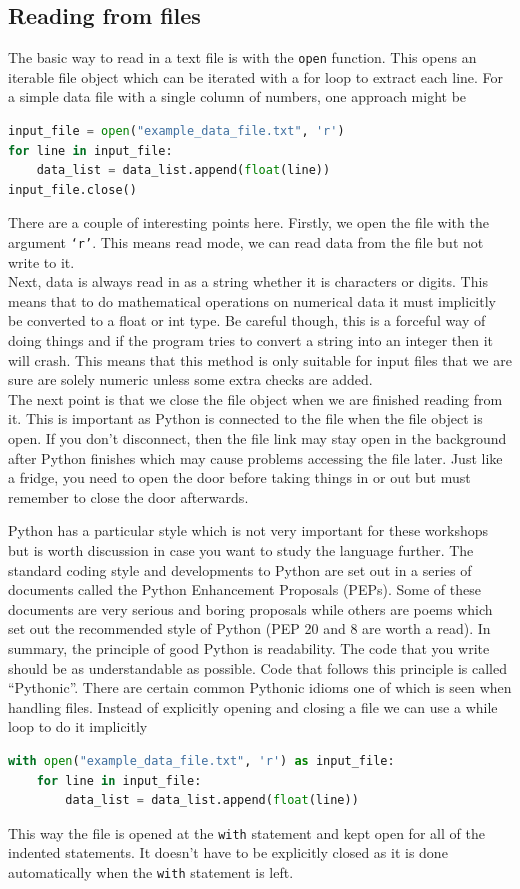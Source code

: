 	\subsection{Reading from files}
		The basic way to read in a text file is with the \texttt{open} function. This opens an iterable file object which can be iterated with a for loop to extract each line. For a simple data file with a single column of numbers, one approach might be
		\begin{lstlisting}[language=Python]
input_file = open("example_data_file.txt", 'r')
for line in input_file:
	data_list = data_list.append(float(line))
input_file.close()
\end{lstlisting}	
		There are a couple of interesting points here. Firstly, we open the file with the argument \texttt{`r'}. This means read mode, we can read data from the file but not write to it.\\
		Next, data is always read in as a string whether it is characters or digits. This means that to do mathematical operations on numerical data it must implicitly be converted to a float or int type. Be careful though, this is a forceful way of doing things and if the program tries to convert a string into an integer then it will crash. This means that this method is only suitable for input files that we are sure are solely numeric unless some extra checks are added.\\
		The next point is that we close the file object when we are finished reading from it. This is important as Python is connected to the file when the file object is open. If you don't disconnect, then the file link may stay open in the background after Python finishes which may cause problems accessing the file later. Just like a fridge, you need to open the door before taking things in or out but must remember to close the door afterwards.

		Python has a particular style which is not very important for these workshops but is worth discussion in case you want to study the language further. The standard coding style and developments to Python are set out in a series of documents called the Python Enhancement Proposals (PEPs). Some of these documents are very serious and boring proposals while others are poems which set out the recommended style of Python (PEP 20 and 8 are worth a read). In summary, the principle of good Python is readability. The code that you write should be as understandable as possible. Code that follows this principle is called ``Pythonic''. There are certain common Pythonic idioms one of which is seen when handling files. Instead of explicitly opening and closing a file we can use a while loop to do it implicitly
		\begin{lstlisting}[language=Python]
with open("example_data_file.txt", 'r') as input_file:
	for line in input_file:
		data_list = data_list.append(float(line))
\end{lstlisting}	
This way the file is opened at the \texttt{with} statement and kept open for all of the indented statements. It doesn't have to be explicitly closed as it is done automatically when the \texttt{with} statement is left.

